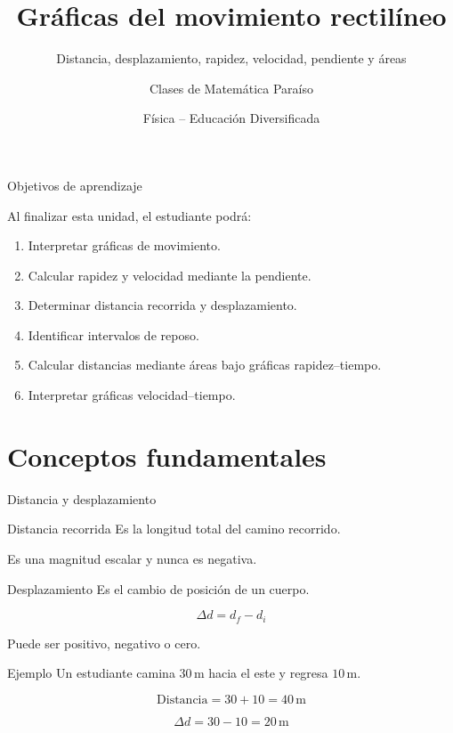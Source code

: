 \documentclass[aspectratio=169,10pt]{beamer}
\title{Gráficas del movimiento rectilíneo}
\subtitle{
Distancia, desplazamiento, rapidez,
velocidad, pendiente y áreas
}
\author{Clases de Matemática Paraíso}
\date{Física -- Educación Diversificada}
\begin{document}
\begin{frame}
\titlepage
\end{frame}

\begin{frame}{Objetivos de aprendizaje}

Al finalizar esta unidad, el estudiante podrá:

\begin{enumerate}
\item Interpretar gráficas de movimiento.

\item Calcular rapidez y velocidad
mediante la pendiente.

\item Determinar distancia recorrida
y desplazamiento.

\item Identificar intervalos de reposo.

\item Calcular distancias mediante
áreas bajo gráficas rapidez--tiempo.

\item Interpretar gráficas
velocidad--tiempo.
\end{enumerate}

\end{frame}

\section{Conceptos fundamentales}

\begin{frame}{Distancia y desplazamiento}

\begin{block}{Distancia recorrida}
Es la longitud total del camino recorrido.

Es una magnitud escalar y nunca es negativa.
\end{block}

\begin{block}{Desplazamiento}
Es el cambio de posición de un cuerpo.

\[
\Delta d=d_f-d_i
\]

Puede ser positivo, negativo o cero.
\end{block}

\begin{exampleblock}{Ejemplo}
Un estudiante camina $30\,\mathrm{m}$
hacia el este y regresa $10\,\mathrm{m}$.

\[
\text{Distancia}=30+10=40\,\mathrm{m}
\]

\[
\Delta d=30-10=20\,\mathrm{m}
\]
\end{exampleblock}

\end{frame}
\end{document}
